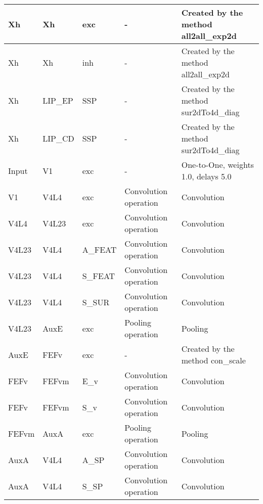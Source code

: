 \documentclass{article}
\begin{document}
\begin{xltabular}{\linewidth}{|l|l|l|X|X|}
    Xh & Xh & exc & - &
    Created by the method all2all\_exp2d \\ \hline

    Xh & Xh & inh & - &
    Created by the method all2all\_exp2d \\ \hline

    Xh & LIP\_EP & SSP & - &
    Created by the method sur2dTo4d\_diag \\ \hline

    Xh & LIP\_CD & SSP & - &
    Created by the method sur2dTo4d\_diag \\ \hline

    Input & V1 & exc & - &
    One-to-One, weights 1.0, delays 5.0 \\ \hline

    V1 & V4L4 & exc & Convolution operation &
    Convolution \\ \hline

    V4L4 & V4L23 & exc & Convolution operation &
    Convolution \\ \hline

    V4L23 & V4L4 & A\_FEAT & Convolution operation &
    Convolution \\ \hline

    V4L23 & V4L4 & S\_FEAT & Convolution operation &
    Convolution \\ \hline

    V4L23 & V4L4 & S\_SUR & Convolution operation &
    Convolution \\ \hline

    V4L23 & AuxE & exc & Pooling operation &
    Pooling \\ \hline

    AuxE & FEFv & exc & - &
    Created by the method con\_scale \\ \hline

    FEFv & FEFvm & E\_v & Convolution operation &
    Convolution \\ \hline

    FEFv & FEFvm & S\_v & Convolution operation &
    Convolution \\ \hline

    FEFvm & AuxA & exc & Pooling operation &
    Pooling \\ \hline

    AuxA & V4L4 & A\_SP & Convolution operation &
    Convolution \\ \hline

    AuxA & V4L4 & S\_SP & Convolution operation &
    Convolution \\ \hline


\end{xltabular}
\end{document}
